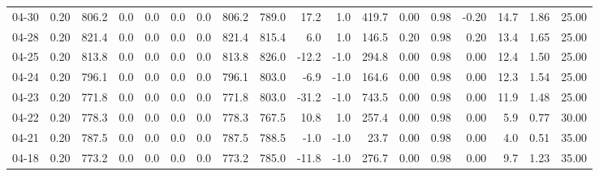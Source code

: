 \begin{threeparttable}
{\begin{tabular}{lrrrrrrrrrrrrrrrrr}
  04-30 &     0.20 & 806.2 &               0.0 &               0.0 &                0.0 &                0.0 & 806.2 & 789.0 &       17.2 &                      1.0 &               419.7 &       0.00 &      0.98 &          -0.20 &             14.7 &            1.86 &                  25.00 \\
  04-28 &     0.20 & 821.4 &               0.0 &               0.0 &                0.0 &                0.0 & 821.4 & 815.4 &        6.0 &                      1.0 &               146.5 &       0.20 &      0.98 &           0.20 &             13.4 &            1.65 &                  25.00 \\
  04-25 &     0.20 & 813.8 &               0.0 &               0.0 &                0.0 &                0.0 & 813.8 & 826.0 &      -12.2 &                     -1.0 &               294.8 &       0.00 &      0.98 &           0.00 &             12.4 &            1.50 &                  25.00 \\
  04-24 &     0.20 & 796.1 &               0.0 &               0.0 &                0.0 &                0.0 & 796.1 & 803.0 &       -6.9 &                     -1.0 &               164.6 &       0.00 &      0.98 &           0.00 &             12.3 &            1.54 &                  25.00 \\
  04-23 &     0.20 & 771.8 &               0.0 &               0.0 &                0.0 &                0.0 & 771.8 & 803.0 &      -31.2 &                     -1.0 &               743.5 &       0.00 &      0.98 &           0.00 &             11.9 &            1.48 &                  25.00 \\
  04-22 &     0.20 & 778.3 &               0.0 &               0.0 &                0.0 &                0.0 & 778.3 & 767.5 &       10.8 &                      1.0 &               257.4 &       0.00 &      0.98 &           0.00 &              5.9 &            0.77 &                  30.00 \\
  04-21 &     0.20 & 787.5 &               0.0 &               0.0 &                0.0 &                0.0 & 787.5 & 788.5 &       -1.0 &                     -1.0 &                23.7 &       0.00 &      0.98 &           0.00 &              4.0 &            0.51 &                  35.00 \\
  04-18 &     0.20 & 773.2 &               0.0 &               0.0 &                0.0 &                0.0 & 773.2 & 785.0 &      -11.8 &                     -1.0 &               276.7 &       0.00 &      0.98 &           0.00 &              9.7 &            1.23 &                  35.00 \\

\end{tabular}}
\end{threeparttable}
